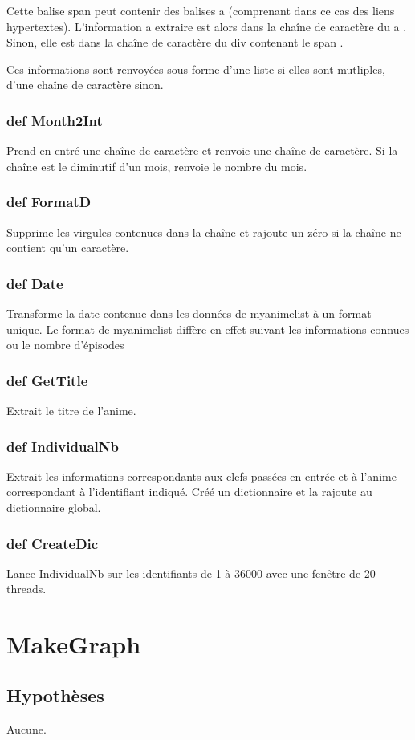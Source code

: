 \documentclass[a4paper,12pt]{article}
\begin{document}
Cette balise \og span \fg peut contenir des balises \og a \fg (comprenant dans ce cas des liens hypertextes). L'information a extraire est alors dans la chaîne de caractère du \og a \fg. Sinon, elle est dans la chaîne de caractère du \og div \fg{} contenant le \og span \fg.     

Ces informations sont renvoyées sous forme d'une liste si elles sont mutliples, d'une chaîne de caractère sinon.
\subsubsection{def Month2Int}
Prend en entré une chaîne de caractère et renvoie une chaîne de caractère. Si la chaîne est le diminutif d'un mois, renvoie le nombre du mois.
\subsubsection{def FormatD}
Supprime les virgules contenues dans la chaîne et rajoute un zéro si la chaîne ne contient qu'un caractère.
\subsubsection{def Date}
Transforme la date contenue dans les données de myanimelist à un format unique. Le format de myanimelist diffère en effet suivant les informations connues ou le nombre d'épisodes
\subsubsection{def GetTitle}
Extrait le titre de l'anime.
\subsubsection{def IndividualNb}
Extrait les informations correspondants aux clefs passées en entrée et à l'anime correspondant à l'identifiant indiqué. Créé un dictionnaire et la rajoute au dictionnaire global.
\subsubsection{def CreateDic}
Lance IndividualNb sur les identifiants de 1 à 36000 avec une fenêtre de 20 threads.

\section{MakeGraph}
\subsection{Hypothèses}
Aucune.
\end{document}
